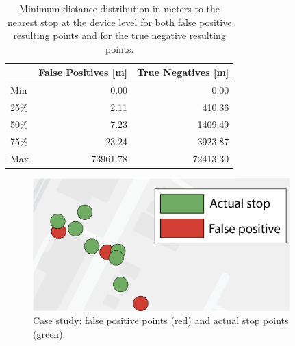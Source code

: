 \documentclass{article}
\begin{document}
 \begin{minipage}[b]{0.5\textwidth}
    \centering
        \begin{table}[H]
        	\centering
        	\begin{tabular}{l|r|r}
        		\toprule
        		& \textbf{False Positives [m]}  & \textbf{True Negatives [m]}  \\
        		\midrule
                Min  & 0.00 & 0.00 \\ 
                25\% & 2.11 & 410.36 \\ 
                50\% & 7.23 & 1409.49 \\ 
                75\% & 23.24 & 3923.87 \\ 
                Max  & 73961.78 & 72413.30 \\ 
        		\bottomrule
        	\end{tabular}
        	\label{tab:tn_fp_analysis} 
        \vspace{3.5mm}
        \caption{Minimum distance distribution in meters to the nearest stop at the device level for both false positive resulting points and for the true negative resulting points.}
        \vspace{-3.5mm}
        \end{table}
\end{minipage}
\hspace{0.05\textwidth} %
\begin{minipage}[b]{0.40\textwidth}
    \centering
        \begin{figure}[H]
        \includegraphics[width=0.885\textwidth]{./Images/False_postives_of_algortihm.png}
        	\centering
        	\caption{Case study: false positive points (red) and actual stop points (green).}
        	\label{fig: False_positives}
        \end{figure}
\end{minipage}
\end{document}
